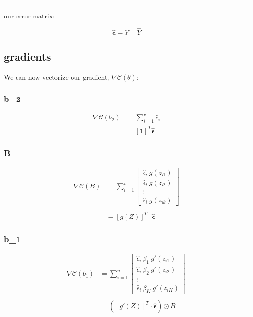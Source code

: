 \documentclass[
]{book}
\begin{document}
\begin{center}\rule{0.5\linewidth}{0.5pt}\end{center}

our error matrix:

\[\mathbf{\hat \epsilon}= Y - \hat Y\]

\hypertarget{gradients}{%
\subsection{gradients}\label{gradients}}

We can now vectorize our gradient, \(\nabla \mathcal{C}(\theta)\):

\hypertarget{b_2}{%
\subsubsection{b\_2}\label{b_2}}

\[
\begin{aligned}
\nabla \mathcal{C}(b_2) &= \sum_{i = 1}^n \hat \epsilon_i\\
&= [\mathbf 1]^T \mathbf{\hat \epsilon}
\end{aligned}
\]

\hypertarget{b}{%
\subsubsection{B}\label{b}}

\[
\begin{aligned}
\nabla \mathcal{C}(B) &=  \sum_{i = 1}^n 
\begin{bmatrix}
\hat \epsilon_i\ g(z_{i1}) \\
\hat \epsilon_i\ g(z_{i2}) \\
\vdots \\
\hat \epsilon_i\ g(z_{ik})
\end{bmatrix} \\ \\
&= [g(Z)]^T \cdot \mathbf{\hat \epsilon}
\end{aligned}
\]

\hypertarget{b_1}{%
\subsubsection{b\_1}\label{b_1}}

\[
\begin{aligned}
\nabla \mathcal{C}(b_1) &= \sum_{i = 1}^n 
\begin{bmatrix}
\hat \epsilon_i\ \beta_1 \ g'(z_{i1})  \\
\hat \epsilon_i\ \beta_2 \ g'(z_{i2}) \\
\vdots \\
\hat \epsilon_i\ \beta_K \ g'(z_{iK})
\end{bmatrix} \\ \\
&= \left([g'(Z)]^T \cdot \mathbf{\hat \epsilon}\right) \odot B
\end{aligned}
\]
\end{document}
